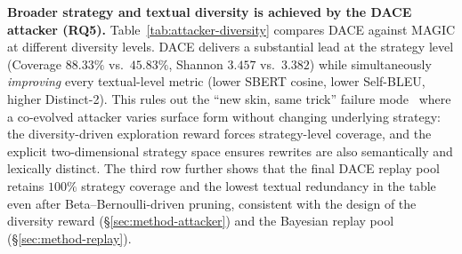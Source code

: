 \documentclass{article}
\newcommand{\method}{\textsc{DACE}\xspace}
\begin{document}
\textbf{Broader strategy and textual diversity is achieved by the \method attacker (RQ5).} Table~\ref{tab:attacker-diversity} compares \method against MAGIC at different diversity levels. \method delivers a substantial lead at the strategy level (Coverage $88.33\%$ vs.\ $45.83\%$, Shannon $3.457$ vs.\ $3.382$) while simultaneously \emph{improving} every textual-level metric (lower SBERT cosine, lower Self-BLEU, higher Distinct-2). This rules out the ``new skin, same trick'' failure mode~\citep{triplayrl2026} where a co-evolved attacker varies surface form without changing underlying strategy: the diversity-driven exploration reward forces strategy-level coverage, and the explicit two-dimensional strategy space ensures rewrites are also semantically and lexically distinct. The third row further shows that the final \method replay pool retains $100\%$ strategy coverage and the lowest textual redundancy in the table even after Beta--Bernoulli-driven pruning, consistent with the design of the diversity reward (\S\ref{sec:method-attacker}) and the Bayesian replay pool (\S\ref{sec:method-replay}).
\end{document}
